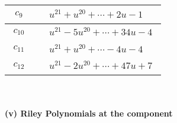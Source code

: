 \documentclass[1p]{elsarticle_modified}
\theoremstyle{definition}
\begin{document}
\begin{tabular}{m{50pt}|m{274pt}}
\hline $$\begin{aligned}c_{9}\end{aligned}$$&$\begin{aligned}
&u^{21}+u^{20}+\cdots+2 u-1
\end{aligned}$\\
\hline $$\begin{aligned}c_{10}\end{aligned}$$&$\begin{aligned}
&u^{21}-5 u^{20}+\cdots+34 u-4
\end{aligned}$\\
\hline $$\begin{aligned}c_{11}\end{aligned}$$&$\begin{aligned}
&u^{21}+u^{20}+\cdots-4 u-4
\end{aligned}$\\
\hline $$\begin{aligned}c_{12}\end{aligned}$$&$\begin{aligned}
&u^{21}-2 u^{20}+\cdots+47 u+7
\end{aligned}$\\
\hline
\end{tabular}\\~\\
\newpage\renewcommand{\arraystretch}{1}
\flushleft \textbf{(v) Riley Polynomials at the component}\newline \\
\end{document}
